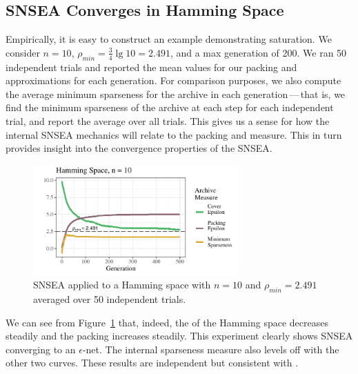 \documentclass[twoside]{article}
\begin{document}
\subsection{SNSEA Converges in Hamming Space}
\label{subsec:hamming}

Empirically, it is easy to construct an example demonstrating saturation.  We consider $n=10$, $\rho_{min} = \frac{3}{4} \lg 10 = 2.491$, and a max generation of 200.  We ran 50 independent trials and reported the mean values for our packing and  approximations for each generation.  For comparison purposes, we also compute the average minimum sparseness for the archive in each generation\,---\,that is, we find the minimum sparseness of the archive at each step for each independent trial, and report the average over all trials.  This gives us a sense for how the internal SNSEA mechanics will relate to the packing and  measure.  This in turn provides insight into the convergence properties of the SNSEA.
%
\begin{figure}[h]
  \center\includegraphics[width=0.7\textwidth]{Figures/hamming-500-n10-NOPOP.pdf}
  \caption{\label{fig:hamming:nopop:n10} SNSEA applied to a Hamming space with $n=10$ and $\rho_{min} = 2.491$ averaged over 50 independent trials.}
\end{figure}

We can see from Figure~\ref{fig:hamming:nopop:n10} that, indeed, the  of the Hamming space decreases steadily and the packing increases steadily.  This experiment clearly shows SNSEA converging to an $\epsilon$-net.  The internal sparseness measure also levels off with the other two curves.  These results are independent but consistent with \citep{Wiegand2020flairs}.  
\end{document}
